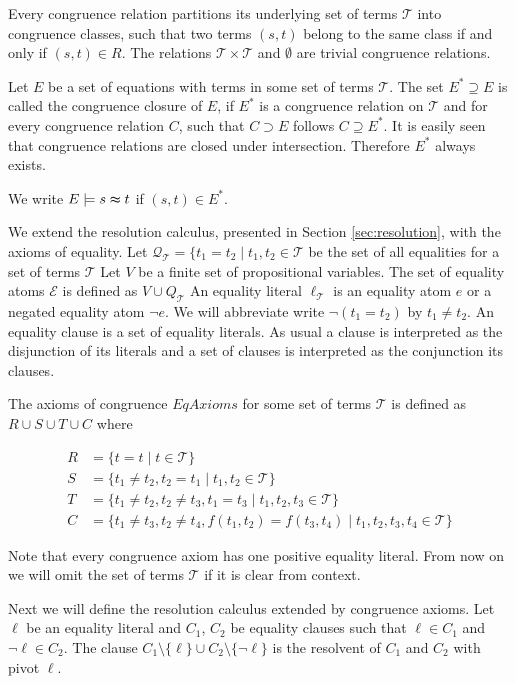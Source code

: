 Every congruence relation partitions its underlying set of terms $\mathcal{T}$ into congruence classes, such that two terms $(s,t)$ belong to the same class if and only if $(s,t) \in R$.
The relations $\mathcal{T} \times \mathcal{T}$ and $\emptyset$ are trivial congruence relations.

Let $E$ be a set of equations with terms in some set of terms $\mathcal{T}$.
The set $E^* \supseteq E$ is called the congruence closure of $E$, 
if $E^*$ is a congruence relation on $\mathcal{T}$ and for every congruence relation $C$, such that $C \supset E$ follows $C \supseteq E^*$.
It is easily seen that congruence relations are closed under intersection.
Therefore $E^*$ always exists.

We write $E \models s \thickapprox t$ if $(s,t) \in E^*$.

We extend the resolution calculus, presented in Section \ref{sec:resolution}, with the axioms of equality.
Let $\mathcal{Q}_{\mathcal{T}} = \{t_1 = t_2 \mid t_1, t_2 \in \mathcal{T}$ be the set of all equalities for a set of terms $\mathcal{T}$
Let $V$ be a finite set of propositional variables.
The set of equality atoms $\mathcal{E}$ is defined as $V \cup Q_{\mathcal{T}}$
An equality literal $\ell_\mathcal{T}$ is an equality atom $e$ or a negated equality atom $\neg e$.
We will abbreviate write $\neg (t_1 = t_2)$ by $t_1 \neq t_2$.
An equality clause is a set of equality literals.
As usual a clause is interpreted as the disjunction of its literals and a set of clauses is interpreted as the conjunction its clauses.

The axioms of congruence $EqAxioms$ for some set of terms $\mathcal{T}$ is defined as $R \cup S \cup T \cup C$ where

\begin{align*}
	R &= \{ t = t \mid t \in \mathcal{T}\} \\
	S &= \{ t_1 \neq t_2, t_2 = t_1 \mid t_1, t_2 \in \mathcal{T} \} \\
	T &= \{ t_1 \neq t_2, t_2 \neq t_3, t_1 = t_3 \mid t_1, t_2, t_3 \in \mathcal{T} \} \\
	C &= \{ t_1 \neq t_3, t_2 \neq t_4, f(t_1,t_2) = f(t_3,t_4) \mid t_1, t_2, t_3, t_4 \in \mathcal{T} \} 
\end{align*}

Note that every congruence axiom has one positive equality literal.
From now on we will omit the set of terms $\mathcal{T}$ if it is clear from context.

Next we will define the resolution calculus extended by congruence axioms.
Let $\ell$ be an equality literal and $C_1$, $C_2$ be equality clauses such that $\ell \in C_1$ and $\neg \ell \in C_2$.
The clause $C_1 \setminus \{\ell\} \cup C_2 \setminus \{\neg \ell\}$ is the resolvent of $C_1$ and $C_2$ with pivot $\ell$.

